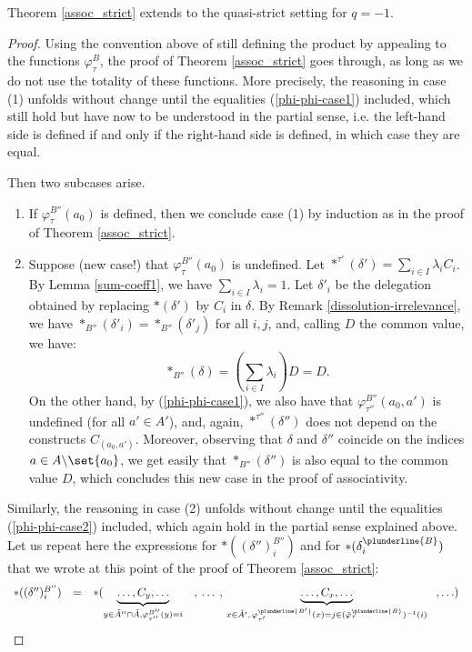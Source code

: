 \begin{theorem}\label{assoc_quasi_strict}
Theorem \ref{assoc_strict} extends to the quasi-strict setting for $q=-1$.
\end{theorem}
\begin{proof}
Using the convention above of still defining the   product by appealing to the functions $\varphi_\tau^B$,  the proof of Theorem \ref{assoc_strict} goes through, as long as we do not use the totality of these functions. More precisely, the reasoning in case (1) unfolds without change until the equalities (\ref{phi-phi-case1}) included, which still hold but have now to be understood in the partial sense, i.e. the left-hand side is defined if and only if the right-hand side is defined, in which case they are equal. 

Then two subcases arise.
\begin{enumerate}
\item[(1a)] If $\varphi_\tau^{B''}(a_0)$ is defined, then we conclude case (1) by induction as in the proof of Theorem  \ref{assoc_strict}.
\item[(1b)] Suppose   (new case!) that  $\varphi_\tau^{B''}(a_0)$ is undefined.    Let $\ast^{\tau'}(\delta')=\sum_{i\in I}\lambda_i C_i$.  By Lemma \ref{sum-coeff1}, we have 
$\sum_{i\in I}\lambda_i=1$. Let $\delta'_i$ be the delegation obtained by replacing $\ast(\delta')$ by $C_i$ in $\delta$. By Remark \ref{dissolution-irrelevance}, we have 
$\ast_{B''}(\delta'_i)=\ast_{B''}(\delta'_j)$ for all $i,j$, and, calling  $D$  the common value, we have:
$$\ast_{B''}(\delta)= (\sum_{i\in I}\lambda_i) D = D.$$
On the other hand, by (\ref{phi-phi-case1}), we also have that 
$\varphi_{\tau''}^{B''}(a_0,a')$ is undefined (for all $a'\in A'$), and, again, $\ast^{\tau''}(\delta'')$ does not depend on the  constructs $C_{(a_0,a')}$.  
Moreover, observing that $\delta$ and $\delta''$  coincide on the indices $a\in A\backslash\set{a_0}$,  we get easily that
$\ast_{B''}(\delta'')$ is also equal to the common value $D$, which concludes this new case in the proof of associativity.
\end{enumerate}
Similarly, the reasoning in case (2) unfolds without change until the equalities (\ref{phi-phi-case2}) included, which again hold in the partial sense explained above. Let us repeat here the expressions for $ \ast((\delta'')^{B''}_{i})$ and  for $\ast(\delta_i^{\plunderline{B}})$ that we wrote at this point of the proof of Theorem \ref{assoc_strict}:
 $$\begin{array}{lll}
 \ast((\delta'')^{B''}_{i}) & = &  \ast(\underbrace{\ldots, C_y, \ldots}_{y\in \tilde{A}''\cap \tilde{A},\varphi_{\tau''}^{B''}(y)=i}\,\,\,\,\,\,,\:\ldots\:,\,\underbrace{\ldots, C_x, \ldots}_{x\in \tilde{A}',\, \varphi^{\plunderline{B'}}_{\tau'}(x)=j\in (\tilde{\varphi}_{\tau}^{\plunderline{B}})^{-1}(i)}  \,\,\,\;,\ldots)\\

\end{array}$$
\end{proof}
